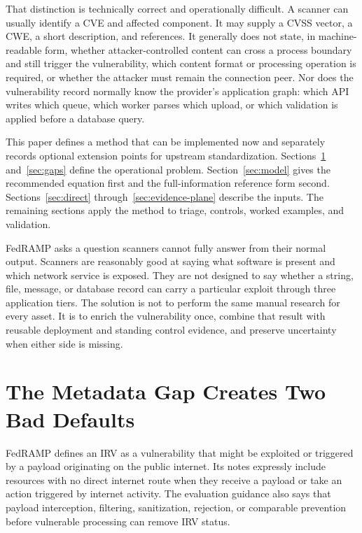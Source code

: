 \documentclass[11pt]{article}
\begin{document}
That distinction is technically correct and operationally difficult. A
scanner can usually identify a CVE and affected component. It may supply a
CVSS vector, a CWE, a short description, and references. It generally does not
state, in machine-readable form, whether attacker-controlled content can cross
a process boundary and still trigger the vulnerability, which content format
or processing operation is required, or whether the attacker must remain the
connection peer. Nor does the vulnerability record normally know the
provider's application graph: which API writes which queue, which worker parses
which upload, or which validation is applied before a database query.

This paper defines a method that can be implemented now and separately records
optional extension points for upstream standardization. Sections~\ref{sec:two-defaults}
and~\ref{sec:gaps} define the operational problem. Section~\ref{sec:model}
gives the recommended equation first and the full-information reference form
second. Sections~\ref{sec:direct} through~\ref{sec:evidence-plane} describe the
inputs. The remaining sections apply the method to triage, controls, worked
examples, and validation.

\begin{plain}
FedRAMP asks a question scanners cannot fully answer from their normal output.
Scanners are reasonably good at saying what software is present and which
network service is exposed. They are not designed to say whether a string,
file, message, or database record can carry a particular exploit through three
application tiers. The solution is not to perform the same manual research for
every asset. It is to enrich the vulnerability once, combine that result with
reusable deployment and standing control evidence, and preserve uncertainty
when either side is missing.
\end{plain}

\section{The Metadata Gap Creates Two Bad Defaults}
\label{sec:two-defaults}
FedRAMP defines an IRV as a vulnerability that might be exploited or triggered
by a payload originating on the public internet. Its notes expressly include
resources with no direct internet route when they receive a payload or take an
action triggered by internet activity. The evaluation guidance also says that
payload interception, filtering, sanitization, rejection, or comparable
prevention before vulnerable processing can remove IRV status.\cite{fedramp-definitions,fedramp-ver}
\end{document}
